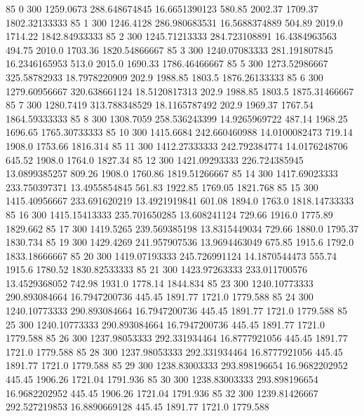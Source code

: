 85  0  300  1259.0673  288.648674845  16.6651390123  580.85  2002.37  1709.37  1802.32133333 
85  1  300  1246.4128  286.980683531  16.5688374889  504.89  2019.0  1714.22  1842.84933333 
85  2  300  1245.71213333  284.723108891  16.4384963563  494.75  2010.0  1703.36  1820.54866667 
85  3  300  1240.07083333  281.191807845  16.2346165953  513.0  2015.0  1690.33  1786.46466667 
85  5  300  1273.52986667  325.58782933  18.7978220909  202.9  1988.85  1803.5  1876.26133333 
85  6  300  1279.60956667  320.638661124  18.5120817313  202.9  1988.85  1803.5  1875.31466667 
85  7  300  1280.7419  313.788348529  18.1165787492  202.9  1969.37  1767.54  1864.59333333 
85  8  300  1308.7059  258.536243399  14.9265969722  487.14  1968.25  1696.65  1765.30733333 
85  10  300  1415.6684  242.660460988  14.0100082473  719.14  1908.0  1753.66  1816.314 
85  11  300  1412.27333333  242.792384774  14.0176248706  645.52  1908.0  1764.0  1827.34 
85  12  300  1421.09293333  226.724385945  13.0899385257  809.26  1908.0  1760.86  1819.51266667 
85  14  300  1417.69023333  233.750397371  13.4955854845  561.83  1922.85  1769.05  1821.768 
85  15  300  1415.40956667  233.691620219  13.4921919841  601.08  1894.0  1763.0  1818.14733333 
85  16  300  1415.15413333  235.701650285  13.608241124  729.66  1916.0  1775.89  1829.662 
85  17  300  1419.5265  239.569385198  13.8315449034  729.66  1880.0  1795.37  1830.734 
85  19  300  1429.4269  241.957907536  13.9694463049  675.85  1915.6  1792.0  1833.18666667 
85  20  300  1419.07193333  245.726991124  14.1870544473  555.74  1915.6  1780.52  1830.82533333 
85  21  300  1423.97263333  233.011700576  13.4529368052  742.98  1931.0  1778.14  1844.834 
85  23  300  1240.10773333  290.893084664  16.7947200736  445.45  1891.77  1721.0  1779.588 
85  24  300  1240.10773333  290.893084664  16.7947200736  445.45  1891.77  1721.0  1779.588 
85  25  300  1240.10773333  290.893084664  16.7947200736  445.45  1891.77  1721.0  1779.588 
85  26  300  1237.98053333  292.331934464  16.8777921056  445.45  1891.77  1721.0  1779.588 
85  28  300  1237.98053333  292.331934464  16.8777921056  445.45  1891.77  1721.0  1779.588 
85  29  300  1238.83003333  293.898196654  16.9682202952  445.45  1906.26  1721.04  1791.936 
85  30  300  1238.83003333  293.898196654  16.9682202952  445.45  1906.26  1721.04  1791.936 
85  32  300  1239.81426667  292.527219853  16.8890669128  445.45  1891.77  1721.0  1779.588 

